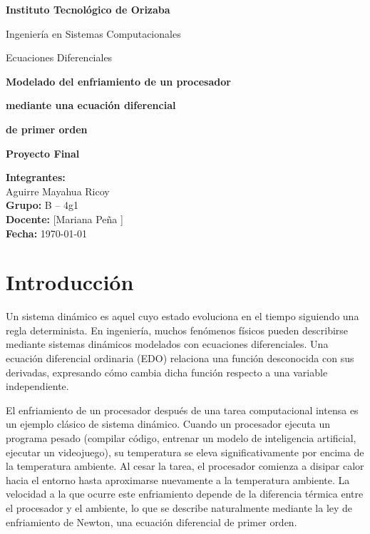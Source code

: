 \documentclass[12pt,a4paper]{article}
\begin{document}
\begin{titlepage}
  \centering
  \vspace*{1.5cm}
  {\LARGE\textbf{Instituto Tecnológico de Orizaba}\par}
  \vspace{0.8cm}
  {\Large Ingeniería en Sistemas Computacionales\par}
  \vspace{0.5cm}
  {\large Ecuaciones Diferenciales\par}
  \vspace{1.5cm}
  {\Huge\textbf{Modelado del enfriamiento de un procesador}\par}
  {\Huge\textbf{mediante una ecuaci\'on diferencial}\par}
  {\Huge\textbf{de primer orden}\par}
  \vspace{1.5cm}
  {\Large\textbf{Proyecto Final}\par}
  \vspace{1cm}
  \raggedright
  \textbf{Integrantes:}\\[4pt]
  Aguirre Mayahua Ricoy \\[2pt]
  \textbf{Grupo:} B -- 4g1 \\[4pt]
  \textbf{Docente:} [Mariana Peña ] \\[4pt]
  \textbf{Fecha:} \today
  \vfill
\end{titlepage}

\section{Introducción}

Un sistema dinámico es aquel cuyo estado evoluciona en el tiempo siguiendo una regla determinista. En ingeniería, muchos fenómenos físicos pueden describirse mediante sistemas dinámicos modelados con ecuaciones diferenciales. Una ecuación diferencial ordinaria (EDO) relaciona una función desconocida con sus derivadas, expresando cómo cambia dicha función respecto a una variable independiente.

El enfriamiento de un procesador después de una tarea computacional intensa es un ejemplo clásico de sistema dinámico. Cuando un procesador ejecuta un programa pesado (compilar código, entrenar un modelo de inteligencia artificial, ejecutar un videojuego), su temperatura se eleva significativamente por encima de la temperatura ambiente. Al cesar la tarea, el procesador comienza a disipar calor hacia el entorno hasta aproximarse nuevamente a la temperatura ambiente. La velocidad a la que ocurre este enfriamiento depende de la diferencia térmica entre el procesador y el ambiente, lo que se describe naturalmente mediante la ley de enfriamiento de Newton, una ecuación diferencial de primer orden.
\end{document}
